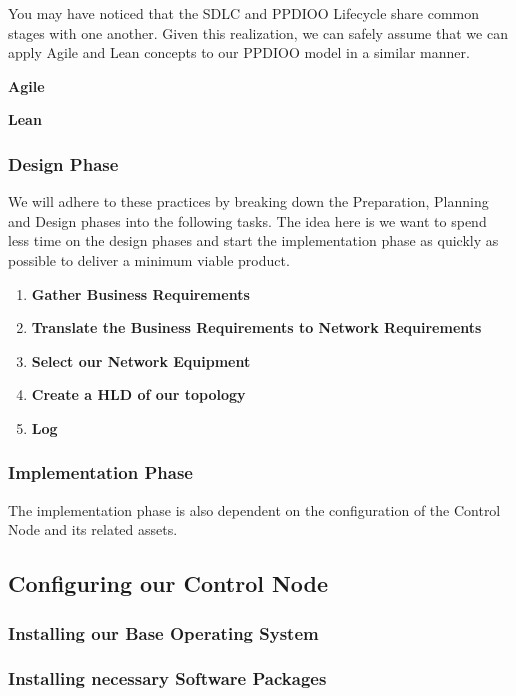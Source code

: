 \documentclass[12pt, letterpaper]{article}
\begin{document}
You may have noticed that the SDLC and PPDIOO Lifecycle share common stages with one another. Given this realization, we can safely assume that we can apply Agile and Lean concepts to our PPDIOO model in a similar manner.

\smallskip

\textbf{Agile}

\smallskip

\textbf{Lean}

\subsubsection{Design Phase}

We will adhere to these practices by breaking down the Preparation, Planning and Design phases into the following tasks. The idea here is we want to spend less time on the design phases and start the implementation phase as quickly as possible to deliver a minimum viable product.

\begin{enumerate}
\item \textbf{Gather Business Requirements}
\item \textbf{Translate the Business Requirements to Network Requirements}
\item \textbf{Select our Network Equipment}
\item \textbf{Create a HLD of our topology}
\item \textbf{Log }
\end{enumerate}

\subsubsection{Implementation Phase}

The implementation phase is also dependent on the configuration of the Control Node and its related assets.


	\subsection{Configuring our Control Node}
	
	\subsubsection{Installing our Base Operating System}
	
	\subsubsection{Installing necessary Software Packages}
	
\end{document}
